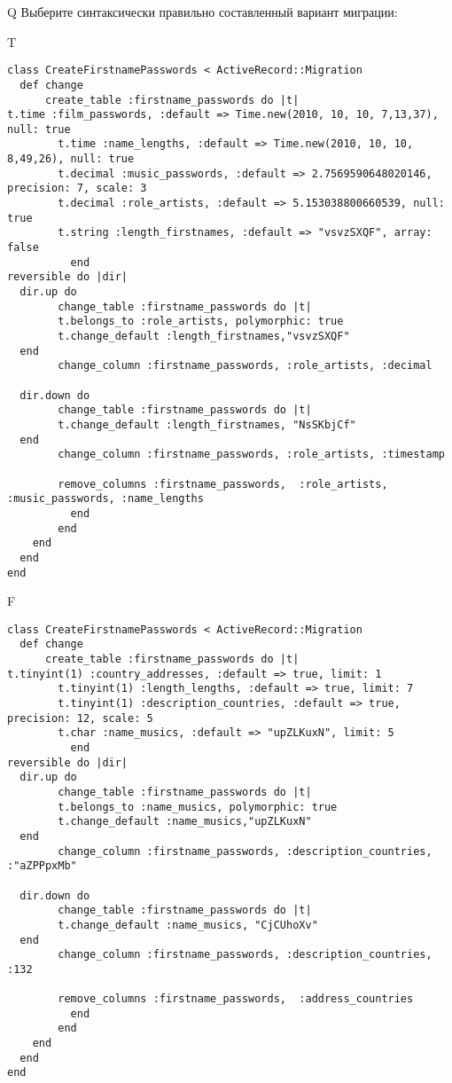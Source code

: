 Q
Выберите синтаксически правильно составленный вариант миграции:

T
\begin{verbatim}
class CreateFirstnamePasswords < ActiveRecord::Migration
  def change
	  create_table :firstname_passwords do |t|
t.time :film_passwords, :default => Time.new(2010, 10, 10, 7,13,37), null: true
		t.time :name_lengths, :default => Time.new(2010, 10, 10, 8,49,26), null: true
		t.decimal :music_passwords, :default => 2.7569590648020146, precision: 7, scale: 3
		t.decimal :role_artists, :default => 5.153038800660539, null: true
		t.string :length_firstnames, :default => "vsvzSXQF", array: false
		  end
reversible do |dir|
  dir.up do
		change_table :firstname_passwords do |t|
		t.belongs_to :role_artists, polymorphic: true
 		t.change_default :length_firstnames,"vsvzSXQF"
  end
 		change_column :firstname_passwords, :role_artists, :decimal
   
  dir.down do
		change_table :firstname_passwords do |t|
		t.change_default :length_firstnames, "NsSKbjCf"
  end
 		change_column :firstname_passwords, :role_artists, :timestamp
   
		remove_columns :firstname_passwords,  :role_artists, :music_passwords, :name_lengths 
	      end
	    end
    end 
  end
end

\end{verbatim}

F
\begin{verbatim}
class CreateFirstnamePasswords < ActiveRecord::Migration
  def change
	  create_table :firstname_passwords do |t|
t.tinyint(1) :country_addresses, :default => true, limit: 1
		t.tinyint(1) :length_lengths, :default => true, limit: 7
		t.tinyint(1) :description_countries, :default => true, precision: 12, scale: 5
		t.char :name_musics, :default => "upZLKuxN", limit: 5
		  end
reversible do |dir|
  dir.up do
		change_table :firstname_passwords do |t|
		t.belongs_to :name_musics, polymorphic: true
 		t.change_default :name_musics,"upZLKuxN"
  end
 		change_column :firstname_passwords, :description_countries, :"aZPPpxMb"
   
  dir.down do
		change_table :firstname_passwords do |t|
		t.change_default :name_musics, "CjCUhoXv"
  end
 		change_column :firstname_passwords, :description_countries, :132
   
		remove_columns :firstname_passwords,  :address_countries 
	      end
	    end
    end 
  end
end

\end{verbatim}


